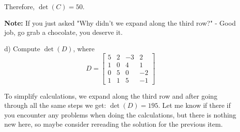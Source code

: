 \begin{sol}
\begin{enumerate}
        Therefore, $\det(C) = 50$.

        \textbf{Note:}
        If you just asked "Why didn't we expand along the third row?" - Good job, go grab a chocolate, you deserve it.

        \item[d)] Compute $\det(D)$, where 
        \[
        D = \begin{bmatrix} 5 & 2 & -3 & 2 \\ 1 & 0 & 4 & 1 \\ 0 & 5 & 0 & -2 \\ 1 & 1 & 5 & -1 \end{bmatrix}
        \]

        To simplify calculations, we expand along the third row and after going through all the same steps we get:
        $\det(D) = 195$. 
        Let me know if there if you encounter any problems when doing the calculations, but there is nothing new here, so maybe consider rereading the solution for the previous item.
        

    \end{enumerate}

    
\end{sol}

